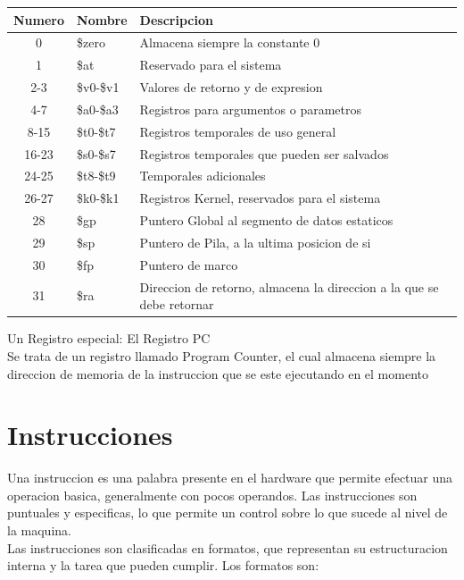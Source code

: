 \documentclass{article}
\begin{document}
\begin{table}[h]
\centering
\begin{tabular}{|c|l|p{7cm}|}
\hline
\textbf{Numero} & \textbf{Nombre} & \textbf{Descripcion} \\ \hline
0     & \$zero  & Almacena siempre la constante 0 \\ \hline
1     & \$at    & Reservado para el sistema \\ \hline
2-3   & \$v0-\$v1 & Valores de retorno y de expresion \\ \hline
4-7   & \$a0-\$a3 & Registros para argumentos o parametros \\ \hline
8-15  & \$t0-\$t7 & Registros temporales de uso general \\ \hline
16-23 & \$s0-\$s7 & Registros temporales que pueden ser salvados \\ \hline
24-25 & \$t8-\$t9 & Temporales adicionales \\ \hline
26-27 & \$k0-\$k1 & Registros Kernel, reservados para el sistema \\ \hline
28    & \$gp    & Puntero Global al segmento de datos estaticos \\ \hline
29    & \$sp    & Puntero de Pila, a la ultima posicion de si \\ \hline
30    & \$fp    & Puntero de marco \\ \hline
31    & \$ra    & Direccion de retorno, almacena la direccion a la que se debe retornar \\ \hline
\end{tabular}
\end{table}

Un Registro especial: El Registro PC \\
Se trata de un registro llamado Program Counter, el cual almacena siempre la direccion de memoria de la instruccion que se este ejecutando en el momento \\

\section{Instrucciones}
Una instruccion es una palabra presente en el hardware que permite efectuar una operacion basica, generalmente con pocos operandos. Las instrucciones son puntuales y especificas, lo que permite un control sobre lo que sucede al nivel de la maquina.\\
Las instrucciones son clasificadas en formatos, que representan su estructuracion interna y la tarea que pueden cumplir.
Los formatos son: \\
\end{document}
